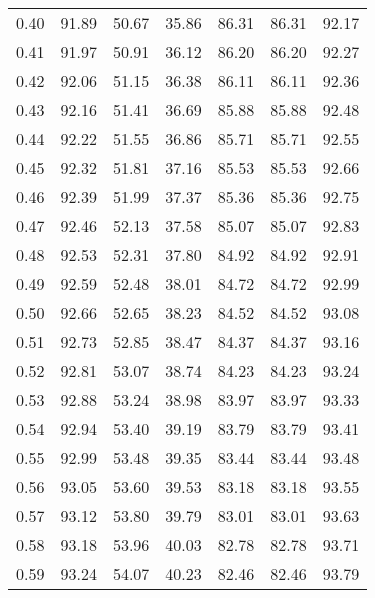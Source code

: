 \begin{tabular}{|c|c|c|c|c|c|c|}
      0.40 &     91.89 &     50.67 &      35.86 &   86.31 &      86.31 &         92.17 \\
      0.41 &     91.97 &     50.91 &      36.12 &   86.20 &      86.20 &         92.27 \\
      0.42 &     92.06 &     51.15 &      36.38 &   86.11 &      86.11 &         92.36 \\
      0.43 &     92.16 &     51.41 &      36.69 &   85.88 &      85.88 &         92.48 \\
      0.44 &     92.22 &     51.55 &      36.86 &   85.71 &      85.71 &         92.55 \\
      0.45 &     92.32 &     51.81 &      37.16 &   85.53 &      85.53 &         92.66 \\
      0.46 &     92.39 &     51.99 &      37.37 &   85.36 &      85.36 &         92.75 \\
      0.47 &     92.46 &     52.13 &      37.58 &   85.07 &      85.07 &         92.83 \\
      0.48 &     92.53 &     52.31 &      37.80 &   84.92 &      84.92 &         92.91 \\
      0.49 &     92.59 &     52.48 &      38.01 &   84.72 &      84.72 &         92.99 \\
      0.50 &     92.66 &     52.65 &      38.23 &   84.52 &      84.52 &         93.08 \\
      0.51 &     92.73 &     52.85 &      38.47 &   84.37 &      84.37 &         93.16 \\
      0.52 &     92.81 &     53.07 &      38.74 &   84.23 &      84.23 &         93.24 \\
      0.53 &     92.88 &     53.24 &      38.98 &   83.97 &      83.97 &         93.33 \\
      0.54 &     92.94 &     53.40 &      39.19 &   83.79 &      83.79 &         93.41 \\
      0.55 &     92.99 &     53.48 &      39.35 &   83.44 &      83.44 &         93.48 \\
      0.56 &     93.05 &     53.60 &      39.53 &   83.18 &      83.18 &         93.55 \\
      0.57 &     93.12 &     53.80 &      39.79 &   83.01 &      83.01 &         93.63 \\
      0.58 &     93.18 &     53.96 &      40.03 &   82.78 &      82.78 &         93.71 \\
      0.59 &     93.24 &     54.07 &      40.23 &   82.46 &      82.46 &         93.79 \\

\end{tabular}
